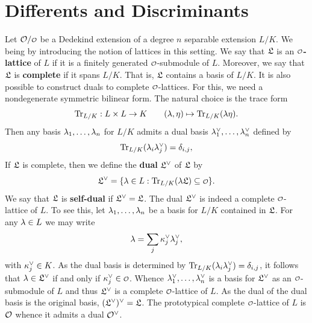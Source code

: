   \section{Differents and Discriminants}
    Let \(\mc{O}/\smc{O}\) be a Dedekind extension of a degree \(n\) separable extension \(L/K\). We being by introducing the notion of lattices in this setting. We say that \(\mathfrak{L}\) is an \textbf{\(\smc{O}\)-lattice} of \(L\) if it is a finitely generated \(\smc{O}\)-submodule of \(L\). Moreover, we say that \(\mathfrak{L}\) is \textbf{complete} if it spans \(L/K\). That is, \(\mathfrak{L}\) contains a basis of \(L/K\). It is also possible to construct duals to complete \(\smc{O}\)-lattices. For this, we need a nondegenerate symmetric bilinear form. The natural choice is the trace form
    \[
      \operatorname{\mathrm{Tr}}_{L/K}:L \times L \to K \qquad (\lambda,\eta) \mapsto \operatorname{\mathrm{Tr}}_{L/K}(\lambda\eta).
    \]
    Then any basis \(\lambda_{1},\ldots,\lambda_{n}\) for \(L/K\) admits a dual basis \(\lambda_{1}^{\vee},\ldots,\lambda_{n}^{\vee}\) defined by
    \[
      \operatorname{\mathrm{Tr}}_{L/K}(\lambda_{i}\lambda_{j}^{\vee}) = \delta_{i,j},
    \]
    If \(\mathfrak{L}\) is complete, then we define the \textbf{dual} \(\mathfrak{L}^{\vee}\) of \(\mathfrak{L}\) by
    \[
      \mf{L}^{\vee} = \{\l \in L:\Trace_{L/K}(\l\mf{L}) \subseteq \smc{O}\}.
    \]
    We say that \(\mathfrak{L}\) is \textbf{self-dual} if \(\mathfrak{L}^{\vee} = \mathfrak{L}\). The dual \(\mathfrak{L}^{\vee}\) is indeed a complete \(\smc{O}\)-lattice of \(L\). To see this, let \(\lambda_{1},\ldots,\lambda_{n}\) be a basis for \(L/K\) contained in \(\mathfrak{L}\). For any \(\lambda \in L\) we may write
    \[
      \lambda = \sum_{j}\kappa_{j}^{\vee}\lambda_{j}^{\vee},
    \]
    with \(\kappa_{j}^{\vee} \in K\). As the dual basis is determined by \(\operatorname{\mathrm{Tr}}_{L/K}(\lambda_{i}\lambda_{j}^{\vee}) = \delta_{i,j}\), it follows that \(\lambda \in \mathfrak{L}^{\vee}\) if and only if \(\k_{j}^{\vee} \in \smc{O}\). Whence \(\lambda_{1}^{\vee},\ldots,\lambda_{n}^{\vee}\) is a basis for \(\mathfrak{L}^{\vee}\) as an \(\smc{O}\)-submodule of \(L\) and thus \(\mathfrak{L}^{\vee}\) is a complete \(\smc{O}\)-lattice of \(L\). As the dual of the dual basis is the original basis, \((\mathfrak{L}^{\vee})^{\vee} = \mathfrak{L}\). The prototypical complete \(\smc{O}\)-lattice of \(L\) is \(\mathcal{O}\) whence it admits a dual \(\mathcal{O}^{\vee}\).

